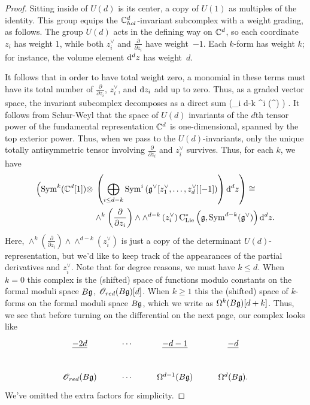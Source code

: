 \begin{proof}
Sitting inside of $U(d)$ is its center, a copy of $U(1)$ as multiples of the identity.
This group equips the $\mathbb C^d_{hol}$-invariant subcomplex with a weight grading, as follows.
The group $U(d)$ acts in the defining way on $\mathbb C^d$,
so each coordinate $z_i$ has weight $1$, 
while both $z_i^\vee$ and $\frac{\partial}{\partial z_i}$ have weight~$-1$. 
Each $k$-form has weight $k$; for instance, the volume element ${\rm d}^d z$ has weight~$d$.

It follows that in order to have total weight zero, a monomial in these terms must have its total number of $\frac{\partial}{\partial z_i}$, $z_i^\vee$, and ${\rm d} z_i$ add up to zero.
Thus, as a graded vector space, the invariant subcomplex decomposes as a direct sum
\beqn
\CC[d] \tensor \left(\bigoplus_{i \leq d-k} \Sym^{i} \left(\fg^ \right) \right) .
\eeqn
It follows from Schur-Weyl that the space of $U(d)$ invariants of the $d$th tensor power of the fundamental representation $\mathbb C^d$ is one-dimensional, spanned by the top exterior power. 
Thus, when we pass to the $U(d)$-invariants, only the unique totally antisymmetric tensor involving $\frac{\partial}{\partial z_i}$ and $z_i^\vee$ survives. 
Thus, for each $k$, we have
\begin{align}
\label{U(d) invariants}
\left({\rm Sym}^k(\mathbb C^d[1]) \otimes \right. & \left. \left(\bigoplus_{i \leq d-k} {\rm Sym}^{i} \left(\mathfrak g^\vee [z_1^\vee,\ldots,z_d^\vee][-1] \right) \right) {\rm d}^d z\right) \cong \\ & \wedge^{k}\left(\frac{\partial}{\partial z_i}\right) \wedge \wedge^{d-k}\left(z_i^\vee\right) {\rm C}_{{\rm Lie}}^*\left(\mathfrak g , {\rm Sym}^{d-k}(\mathfrak g^\vee)\right) {\rm d}^d z .
\end{align}
Here, $\wedge^{k}\left(\frac{\partial}{\partial z_i}\right) \wedge \wedge^{d-k}\left(z_i^\vee\right)$ is just a copy of the determinant $U(d)$-representation, but we'd like to keep track of the appearances of the partial derivatives and $z_i^\vee$. 
Note that for degree reasons, we must have $k \leq d$. 
When $k = 0$ this complex is the (shifted) space of functions modulo constants on the formal moduli space $B\mathfrak g$, $\mathscr O_{red}(B\mathfrak g)[d]$. 
When $k \geq 1$ this the (shifted) space of $k$-forms on the formal moduli space $B\mathfrak g$, which we write as $\Omega^{k}(B \mathfrak g)[d+k]$.
Thus, we see that before turning on the differential on the next page, our complex looks like
\[
\label{bg def complex1}
\xymatrix{
\ul{-2d} & \cdots & \ul{-d-1} & \ul{-d} \\
\sO_{red}(B \fg) & \cdots & \Omega^{d-1} (B \fg) & \Omega^{d}(B \fg) .
}
\]
We've omitted the extra factors for simplicity. 
\end{proof}

